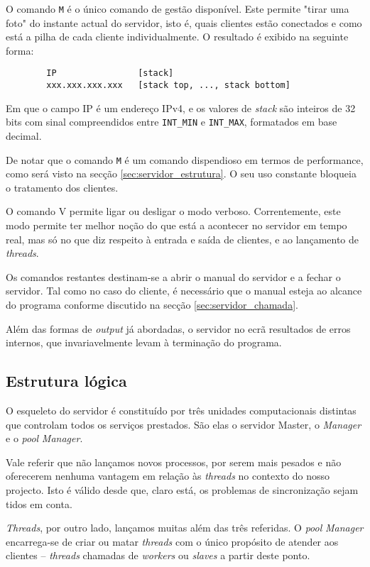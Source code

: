 	O comando \verb|M| é o único comando de gestão disponível.
	Este permite "tirar uma foto" do instante actual do servidor, isto é, quais clientes estão conectados e como está a pilha de cada cliente individualmente.
	O resultado é exibido na seguinte forma:

	\begin{verbatim}
		IP                [stack]
		xxx.xxx.xxx.xxx   [stack top, ..., stack bottom]
	\end{verbatim}

	Em que o campo IP é um endereço IPv4, e os valores de \emph{stack} são inteiros de 32 bits com sinal compreendidos entre \verb|INT_MIN| e \verb|INT_MAX|, formatados em base decimal.

	De notar que o comando \verb|M| é um comando dispendioso em termos de performance, como será visto na secção \ref{sec:servidor_estrutura}.
	O seu uso constante bloqueia o tratamento dos clientes.

	O comando V permite ligar ou desligar o modo verboso.
	Correntemente, este modo permite ter melhor noção do que está a acontecer no servidor em tempo real, mas só no que diz respeito à entrada e saída de clientes, e ao lançamento de \emph{threads}.

	Os comandos restantes destinam-se a abrir o manual do servidor e a fechar o servidor.
	Tal como no caso do cliente, é necessário que o manual esteja ao alcance do programa conforme discutido na secção \ref{sec:servidor_chamada}.

	Além das formas de \emph{output} já abordadas, o servidor no ecrã resultados de erros internos, que invariavelmente levam à terminação do programa.


\clearpage
\subsection{Estrutura lógica\label{sec:servidor_estrutura}}

	\indent\indent O esqueleto do servidor é constituído por três unidades computacionais distintas que controlam todos os serviços prestados.
	São elas o servidor Master, o \emph{Manager} e o \emph{pool} \emph{Manager}.

	Vale referir que não lançamos novos processos, por serem mais pesados e não oferecerem nenhuma vantagem em relação às \emph{threads} no contexto do nosso projecto.
	Isto é válido desde que, claro está, os problemas de sincronização sejam tidos em conta.

	\emph{Threads}, por outro lado, lançamos muitas além das três referidas.
	O \emph{pool} \emph{Manager} encarrega-se de criar ou matar \emph{threads} com o único propósito de atender aos clientes -- \emph{threads} chamadas de \emph{workers} ou \emph{slaves} a partir deste ponto.


